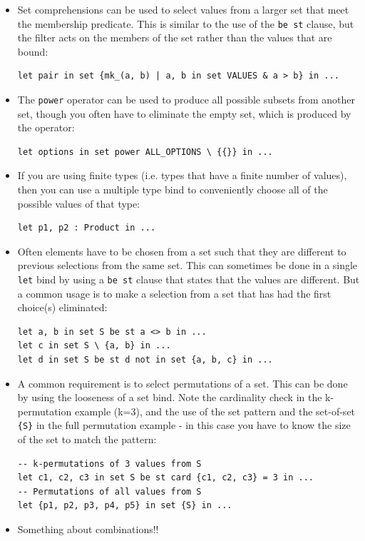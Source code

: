 \documentclass{overturerepchap}
\begin{document}
\begin{itemize}
  \item Set comprehensions can be used to select values from a larger set that
  meet the membership predicate. This is similar to the use of the \texttt{be
  st} clause, but the filter acts on the members of the set rather than the
  values that are bound:
\small
\begin{lstlisting}
let pair in set {mk_(a, b) | a, b in set VALUES & a > b} in ...
\end{lstlisting}
\normalsize
  \item The \texttt{power} operator can be used to produce all possible subsets
  from another set, though you often have to eliminate the empty set, which is
  produced by the operator:
\small
\begin{lstlisting}
let options in set power ALL_OPTIONS \ {{}} in ...
\end{lstlisting}
\normalsize
  \item If you are using finite types (i.e. types that have a finite number of
  values), then you can use a multiple type bind to conveniently choose all of
  the possible values of that type:
\small
\begin{lstlisting}
let p1, p2 : Product in ...
\end{lstlisting}
\normalsize
  \item Often elements have to be chosen from a set such that they are different
  to previous selections from the same set. This can sometimes be done in a
  single \texttt{let} bind by using a \texttt{be st} clause that states that the
  values are different. But a common usage is to make a selection from a set
  that has had the first choice(s) eliminated:
\small
\begin{lstlisting}
let a, b in set S be st a <> b in ...
let c in set S \ {a, b} in ...
let d in set S be st d not in set {a, b, c} in ...
\end{lstlisting}
\normalsize
  \item A common requirement is to select permutations of a set. This can be
  done by using the looseness of a set bind. Note the cardinality check in the
  k-permutation example (k=3), and the use of the set pattern and the
  set-of-set \texttt{\{S\}} in the full permutation example - in this case you
  have to know the size of the set to match the pattern:
\small
\begin{lstlisting}
-- k-permutations of 3 values from S
let c1, c2, c3 in set S be st card {c1, c2, c3} = 3 in ...
-- Permutations of all values from S
let {p1, p2, p3, p4, p5} in set {S} in ...
\end{lstlisting}
\normalsize
  \item Something about combinations!!
\end{itemize}
\end{document}
